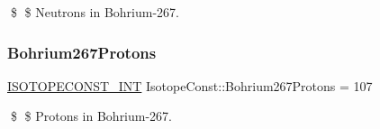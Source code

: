 \$ \$ Neutrons in Bohrium-\/267. \mbox{\label{group___isotope_const-_bohrium-_bh267_ga210e29d6675662e7c88686a3dc31a444}} 
\subsubsection{\texorpdfstring{Bohrium267\+Protons}{Bohrium267Protons}}
{\footnotesize\ttfamily \mbox{\hyperlink{group___isotope_const-_macros_ga5f18360b3e99483a35c32d789e62621c}{I\+S\+O\+T\+O\+P\+E\+C\+O\+N\+S\+T\+\_\+\+I\+NT}} Isotope\+Const\+::\+Bohrium267\+Protons = 107}

\$ \$ Protons in Bohrium-\/267. 